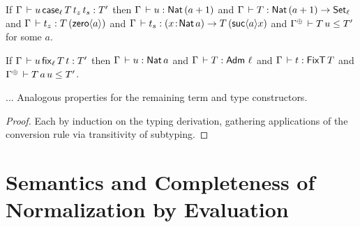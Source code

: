 \documentclass[acmlarge,review,anonymous]{acmart}\settopmatter{printfolios=true}
\newcommand{\SHORTVERSION}[1]{#1}
\begin{document}
\begin{lemma}
\begin{enumerate}
{\item If\/ $\Gamma \der u\,\case[\ell] T {t_z} {t_s} : T'$ then $\Gamma \der u : \Nat (a+1)$ and $\Gamma \der T : \Nat(a+1) \to \Set[\ell]$ and $\Gamma \der t_z : T\,(\zero a)$ and $\Gamma \der t_s : \funT x {\Nat a} {T\,(\suc a x)}$ and $\resurrect\Gamma \der T\,u \leq T'$ for some $a$.
\item If\/ $\Gamma \der u\,\fix[\ell] T t : T'$ then
  $\Gamma \der u : \Nat a$ and
  $\Gamma \der T : \Adm\,\ell$ and
  $\Gamma \der t : \FixT\,T$ and
  $\resurrect\Gamma \der T\,a\,u \leq T'$.
} %
\SHORTVERSION{
\item ... Analogous properties for the remaining term and type constructors.
}
\end{enumerate}
\end{lemma}
\begin{proof}
  Each by induction on the typing derivation, gathering applications of the conversion rule via transitivity of subtyping.
\end{proof}



\section{Semantics and Completeness of Normalization by Evaluation}
\label{sec:sem}
\end{document}

